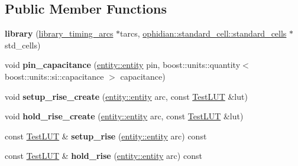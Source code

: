 \subsection*{Public Member Functions}
\begin{DoxyCompactItemize}
\item 
\hypertarget{classophidian_1_1timing_1_1library_ad3636ead6a7f5f606a30ed6aaef8b583}{{\bfseries library} (\hyperlink{classophidian_1_1timing_1_1library__timing__arcs}{library\-\_\-timing\-\_\-arcs} $\ast$tarcs, \hyperlink{classophidian_1_1standard__cell_1_1standard__cells}{ophidian\-::standard\-\_\-cell\-::standard\-\_\-cells} $\ast$std\-\_\-cells)}\label{classophidian_1_1timing_1_1library_ad3636ead6a7f5f606a30ed6aaef8b583}

\item 
\hypertarget{classophidian_1_1timing_1_1library_ac24f818be2f0703c5d30e5efb828de5a}{void {\bfseries pin\-\_\-capacitance} (\hyperlink{classophidian_1_1entity_1_1entity}{entity\-::entity} pin, boost\-::units\-::quantity$<$ boost\-::units\-::si\-::capacitance $>$ capacitance)}\label{classophidian_1_1timing_1_1library_ac24f818be2f0703c5d30e5efb828de5a}

\item 
\hypertarget{classophidian_1_1timing_1_1library_a054b6ca87043b352b3b25a47647d5562}{void {\bfseries setup\-\_\-rise\-\_\-create} (\hyperlink{classophidian_1_1entity_1_1entity}{entity\-::entity} arc, const \hyperlink{classophidian_1_1timing_1_1lookup__table}{Test\-L\-U\-T} \&lut)}\label{classophidian_1_1timing_1_1library_a054b6ca87043b352b3b25a47647d5562}

\item 
\hypertarget{classophidian_1_1timing_1_1library_affd690e12f7ef0ac193dba55fa95c113}{void {\bfseries hold\-\_\-rise\-\_\-create} (\hyperlink{classophidian_1_1entity_1_1entity}{entity\-::entity} arc, const \hyperlink{classophidian_1_1timing_1_1lookup__table}{Test\-L\-U\-T} \&lut)}\label{classophidian_1_1timing_1_1library_affd690e12f7ef0ac193dba55fa95c113}

\item 
\hypertarget{classophidian_1_1timing_1_1library_a4c131116aa7d7cf83b2eb45b14130246}{const \hyperlink{classophidian_1_1timing_1_1lookup__table}{Test\-L\-U\-T} \& {\bfseries setup\-\_\-rise} (\hyperlink{classophidian_1_1entity_1_1entity}{entity\-::entity} arc) const }\label{classophidian_1_1timing_1_1library_a4c131116aa7d7cf83b2eb45b14130246}

\item 
\hypertarget{classophidian_1_1timing_1_1library_a1e0fc898d5613e5373ce17f295eedeef}{const \hyperlink{classophidian_1_1timing_1_1lookup__table}{Test\-L\-U\-T} \& {\bfseries hold\-\_\-rise} (\hyperlink{classophidian_1_1entity_1_1entity}{entity\-::entity} arc) const }\label{classophidian_1_1timing_1_1library_a1e0fc898d5613e5373ce17f295eedeef}


\end{DoxyCompactItemize}
